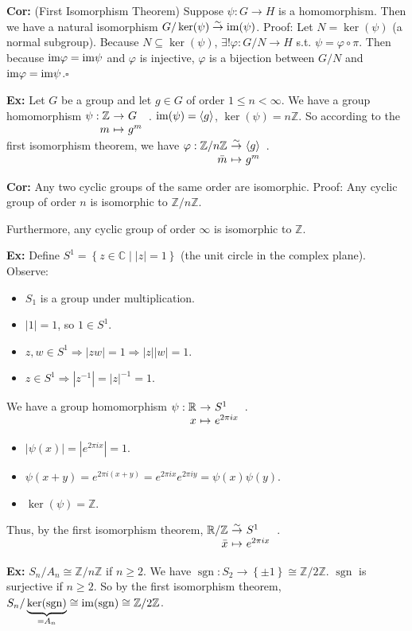 \documentclass[10pt,letterpaper]{article}
\newcommand{\n}{\hfill\break}
\newcommand{\up}{\vspace{-\baselineskip}}
\newcommand{\hangblock}[2]{\par\noindent\settowidth{\hangindent}{\textbf{#1: }}\textbf{#1: }\!\!\!#2}
\newcommand{\cor}[1]{\hangblock{Cor}{#1}}
\newcommand{\ex}[1]{\hangblock{Ex}{#1}}
\newcommand{\proven}{\;$\square$\n}
\newcommand{\set}[1]{\left\{#1\right\}}
\newcommand{\integers}{\mathbb{Z}}
\newcommand{\Z}{\integers}
\newcommand{\reals}{\mathbb{R}}
\newcommand{\R}{\reals}
\newcommand{\complex}{\mathbb{C}}
\newcommand{\C}{\complex}
\newcommand{\inv}{^{-1}}
\newcommand{\abs}[1]{\left|#1\right|}
\newcommand{\of}{\circ}
\DeclareMathOperator{\sgn}{sgn}
\newcommand{\map}[4]{\!\!\!\begin{array}[t]{rcl}#1 & \!\!\!\!\to & \!\!\!\!#2\\ #3 & \!\!\!\!\mapsto & \!\!\!\!#4\end{array}}
\newcommand{\im}{\textrm{\textnormal{im}}}
\newcommand{\generated}[1]{\left<#1\right>}
\newcommand{\isom}[4]{\!\!\!\begin{array}[t]{rcl}#1 & \!\!\!\!\overset{\sim}{\to} & \!\!\!\!#2\\ #3 & \!\!\!\!\mapsto & \!\!\!\!#4\end{array}}
\newcommand{\st}{s.t.}
\newcommand{\unique}{!}
\begin{document}
\cor{
	(First Isomorphism Theorem) Suppose $\psi:G\to{}H$ is a homomorphism. Then we have a natural isomorphism $G/\ker(\psi)\overset{\sim}{\to}\im(\psi)$.\n
	Proof: Let $N=\ker(\psi)$ (a normal subgroup). Because $N\subseteq\ker(\psi)$, $\exists\unique\varphi:G/N\to{}H$ \st{} $\psi=\varphi\of\pi$.\n
	Then because $\im\varphi=\im\psi$ and $\varphi$ is injective, $\varphi$ is a bijection between $G/N$ and $\im\varphi=\im\psi$.\proven
}

\ex{
	Let $G$ be a group and let $g\in{}G$ of order $1\le{}n<\infty$. We have a group homomorphism $\map{\psi:\Z}{G}{m}{g^{m}}$. $\im(\psi)=\generated{g}$, $\ker(\psi)=n\Z$. So according to the first isomorphism theorem, we have $\isom{\varphi:\Z/n\Z}{\generated{g}}{\bar{m}}{g^{m}}$.\n
}

\cor{
	Any two cyclic groups of the same order are isomorphic.\n
	Proof: Any cyclic group of order $n$ is isomorphic to $\Z/n\Z$.\n
}

\par\noindent
Furthermore, any cyclic group of order $\infty$ is isomorphic to $\Z$.\n

\ex{
	Define $S^{1}=\set{z\in\C\mid\abs{z}=1}$ (the unit circle in the complex plane).\n
	Observe:
	\begin{itemize}
		\item $S_{1}$ is a group under multiplication.
		\item $\abs{1}=1$, so $1\in{}S^{1}$.
		\item $z,w\in{}S^{1}\Rightarrow\abs{zw}=1\Rightarrow\abs{z}\abs{w}=1$.
		\item $z\in{}S^{1}\Rightarrow\abs{z\inv}=\abs{z}\inv=1$.
	\end{itemize}\up\n
	We have a group homomorphism $\map{\psi:\R}{S^{1}}{x}{e^{2\pi{}ix}}$.
	\begin{itemize}
		\item $\abs{\psi(x)}=\abs{e^{2\pi{}ix}}=1$.
		\item $\psi(x+y)=e^{2\pi{}i(x+y)}=e^{2\pi{}ix}e^{2\pi{}iy}=\psi(x)\psi(y)$.
		\item $\ker(\psi)=\Z$.
	\end{itemize}\up\n
	Thus, by the first isomorphism theorem, $\isom{\R/\Z}{S^{1}}{\bar{x}}{e^{2\pi{}ix}}$.\n
}

\ex{
	$S_{n}/A_{n}\cong\Z/n\Z$ if $n\ge{}2$. We have $\sgn:S_{2}\to\set{\pm{}1}\cong\Z/2\Z$. $\sgn$ is surjective if $n\ge{}2$.\n
	So by the first isomorphism theorem, $S_{n}/\underbrace{\ker(\sgn)}_{=A_{n}}\cong\im(\sgn)\cong\Z/2\Z$.\n
}
\end{document}
